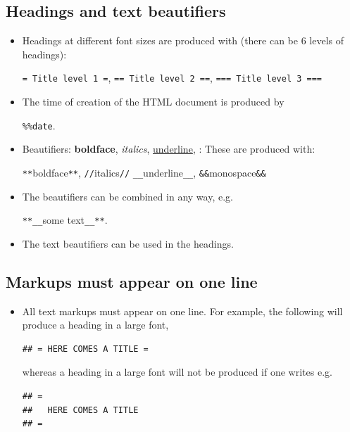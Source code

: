 \documentclass[11pt]{article}
\begin{document}
\subsection{Headings and text beautifiers}
\label{sec:xxx}

\begin{itemize}
\item Headings at different font
  sizes are produced with (there can be 6 levels of headings):

  \verb'= Title level 1 =', \verb'== Title level 2 ==',
  \verb'=== Title level 3 ==='


\item The time of creation of the HTML document is produced by

  \verb'%%date'.

\item{Beautifiers:
    {\bf boldface},
    {\it italics},
    \underline{underline},
    :}
  These are produced with:

  \verb'**'boldface\verb'**',  \verb'//'italics\verb'//'
  \verb'__'underline\verb'__', \verb'&&'monospace\verb'&&'

\item The beautifiers can be combined in any way, e.g.

  \verb'**__'some text\verb'__**'.

\item The text beautifiers can be used in the headings.

\end{itemize}

\subsection{Markups must appear on one line}
\label{sec:xxx}

\begin{itemize}
\item All text markups must appear on one line. For example, the
  following will produce a heading in a large font,
\begin{verbatim}
## = HERE COMES A TITLE =
\end{verbatim}
whereas a heading in a large font will not be produced if one writes e.g.
\begin{verbatim}
## =
##   HERE COMES A TITLE
## =
\end{verbatim}

\end{itemize}
\end{document}
